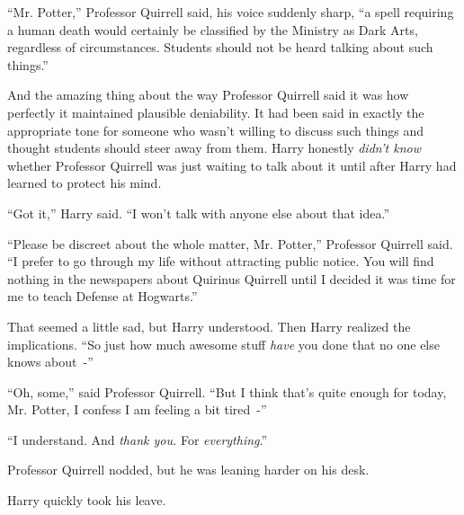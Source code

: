 ``Mr. Potter,'' Professor Quirrell said, his voice suddenly sharp, ``a spell requiring a human death would certainly be classified by the Ministry as Dark Arts, regardless of circumstances. Students should not be heard talking about such things.''

And the amazing thing about the way Professor Quirrell said it was how perfectly it maintained plausible deniability. It had been said in exactly the appropriate tone for someone who wasn't willing to discuss such things and thought students should steer away from them. Harry honestly \emph{didn't know} whether Professor Quirrell was just waiting to talk about it until after Harry had learned to protect his mind.

``Got it,'' Harry said. ``I won't talk with anyone else about that idea.''

``Please be discreet about the whole matter, Mr. Potter,'' Professor Quirrell said. ``I prefer to go through my life without attracting public notice. You will find nothing in the newspapers about Quirinus Quirrell until I decided it was time for me to teach Defense at Hogwarts.''

That seemed a little sad, but Harry understood. Then Harry realized the implications. ``So just how much awesome stuff \emph{have} you done that no one else knows about~-''

``Oh, some,'' said Professor Quirrell. ``But I think that's quite enough for today, Mr. Potter, I confess I am feeling a bit tired~-''

``I understand. And \emph{thank you.} For \emph{everything}.''

Professor Quirrell nodded, but he was leaning harder on his desk.

Harry quickly took his leave.
